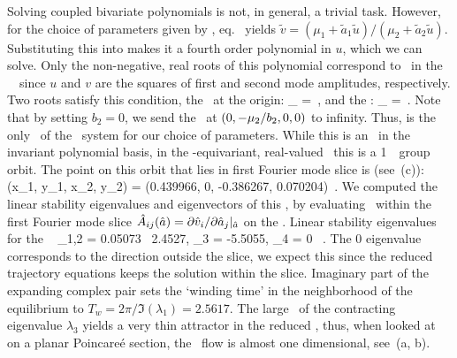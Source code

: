 \documentclass[aip,cha,
reprint,
secnumarabic,
nofootinbib, tightenlines,
nobibnotes, showkeys, showpacs,
superscriptaddress,
]{revtex4-1}
\begin{document}
Solving coupled bivariate polynomials  is not, 
in general, a trivial task. However, for the choice of parameters 
given by , eq.~ yields 
$\tilde{v} = (\mu_1 + \tilde{a}_1 \tilde{u})/(\mu_2 + \tilde{a}_2 \tilde{u})$. 
Substituting this into  makes it a 
fourth order polynomial in $u$, which we can solve. Only the 
non-negative, real roots of this polynomial correspond to \reqva\ 
in the \twomode\ \statesp\ since $u$ and $v$ are the squares of 
first and second mode amplitudes, respectively. Two roots satisfy 
this condition, the \eqv\ at the origin:
\beq
	\invpol_{\EQV{}} = \,, %
and the \reqv:
\beq
	\invpol_{\REQV{}{}} = \,.
\ee{eq:reqv}
Note that by setting $b_2 = 0$, we send the \reqv\ at 
$\cartpt{0,-\mu_2/b_2,0,0}$ to infinity. Thus,  is 
the only \reqv\ of the \twomode\ system for our choice of 
parameters. While this is an \eqv\ in the invariant polynomial 
basis, in the -equivariant, real-valued \statesp\ this is 
a 1\dmn\ \reqv\ group orbit. The point on this orbit that lies in 
first Fourier mode slice is (see \refFig{fig:2modes-ssp}\,(c)):
\beq
  \left(x_1, y_1, x_2, y_2\right) = \left(0.439966, 0, -0.386267, 0.070204\right)
\,.
  \label{e-req}
\eeq
We computed the linear stability eigenvalues and eigenvectors of 
this \reqv , by evaluating \stabmat\ within the first Fourier 
mode slice 
$\hat{{A}}_{ij} (\hat{a}) = \partial \hat{{v}}_i / \partial \hat{a}_j |_{\hat{a}}$ 
on the \reqv . Linear stability eigenvalues for the \reqv\ \refeq{e-req}
\beq
	\lambda_{1,2} = 0.05073 \pm \ii \, 2.4527, \quad
	\lambda_3 = -5.5055, \quad \lambda_4 = 0 \, .
\eeq
The $0$ eigenvalue corresponds to the direction outside the slice, 
we expect this since the reduced trajectory equations 
 keeps the solution within the slice. Imaginary 
part of the expanding complex pair sets the `winding time' in the 
neighborhood of the equilibrium to 
$T_w = 2 \pi / \Im(\lambda_1) = 2.5617$. The large \eqv\  of the 
contracting eigenvalue $\lambda_3$ yields a very thin attractor in 
the reduced \statesp, thus, when looked at on a planar Poincare\'{e} 
section, the \twomode\ flow is almost one dimensional, see 
\,(a, b).
\end{document}
